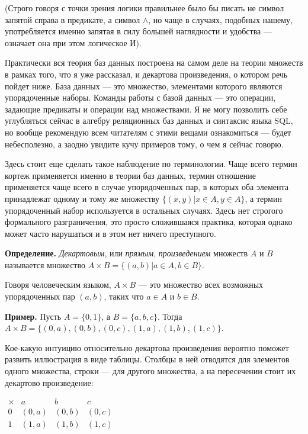 (Строго говоря с точки зрения логики правильнее было бы писать не символ запятой справа в предикате, а символ $\wedge$, но чаще в случаях, подобных нашему, употребляется именно запятая в силу большей наглядности и удобства — означает она при этом логическое И).

Практически вся теория баз данных построена на самом деле на теории множеств в рамках того, что я уже рассказал, и декартова произведения, о котором речь пойдет ниже. База данных — это множество, элементами которого являются упорядоченные наборы. Команды работы с базой данных — это операции, задающие предикаты и операции над множествами. Я не могу позволить себе углубляться сейчас в алгебру реляционных баз данных и синтаксис языка SQL, но вообще рекомендую всем читателям с этими вещами ознакомиться — будет небесполезно, а заодно увидите кучу примеров тому, о чем я сейчас говорю.

Здесь стоит еще сделать такое наблюдение по терминологии. Чаще всего термин кортеж применяется именно в теории баз данных, термин отношение применяется чаще всего в случае упорядоченных пар, в которых оба элемента принадлежат одному и тому же множеству $\{(x, y)|x\in A, y\in A\}$, а термин упорядоченный набор используется в остальных случаях. Здесь нет строгого формального разграничения, это просто сложившаяся практика, которая однако может часто нарушаться и в этом нет ничего преступного.

{\bfseries Определение.} {\slshape Декартовым}, или {\slshape прямым}, {\slshape произведением} множеств $A$ и $B$ называется множество $A\times B = \{(a, b)|a\in A, b\in B\}$.

Говоря человеческим языком, $A\times B$ — это множество всех возможных упорядоченных пар $(a, b)$, таких что $a\in A$ и $b \in B$.

{\bfseries Пример.} Пусть $A = \{0, 1\}$, а $B = \{a, b, c\}$. Тогда $A\times B = \{(0, a), (0, b), (0, c), (1, a), (1, b), (1, c)\}$.

Кое-какую интуицию относительно декартова произведения вероятно поможет развить иллюстрация в виде таблицы. Столбцы в ней отводятся для элементов одного множества, строки — для другого множества, а на пересечении стоит их декартово произведение:

$\begin{array}{c|ccc}\times & a&b&c\\ \hline 0 & (0,a) & (0, b) & (0, c) \\ 1 & (1, a)& (1, b) &(1, c)\end{array}$

